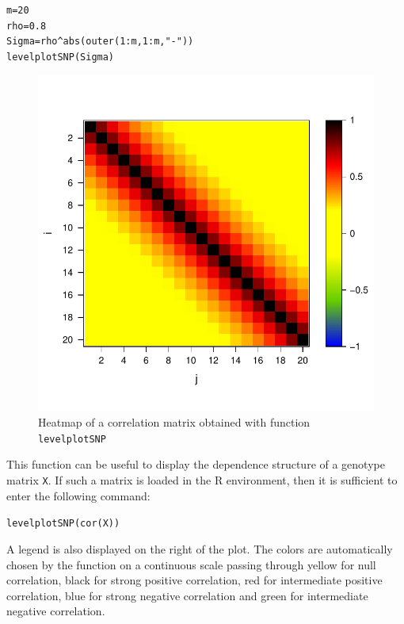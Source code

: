 \documentclass[12pt]{article}
\begin{document}
	 \begin{alltt}
m = 20
rho = 0.8
Sigma = rho\^{}abs(outer(1:m,1:m,"-"))
levelplotSNP(Sigma)
	 \end{alltt}

 	\begin{figure}[!h]
 		\centering
 		\vspace*{-4em}
 		\includegraphics{heatmap.pdf}
 		\vspace*{-2em}
 		\caption{Heatmap of a correlation matrix obtained with function \texttt{levelplotSNP}}
 		\label{fig:heatmap}
 	\end{figure}

	 \noindent This function can be useful to display the dependence structure of a genotype matrix \texttt{X}. If such a matrix is loaded in the R environment, then it is sufficient to enter the following command:

	 \begin{alltt}
	levelplotSNP(cor(X))
	 \end{alltt}

 	 \noindent A legend is also displayed on the right of the plot. The colors are automatically chosen by the function on a continuous scale passing through yellow for null correlation, black for strong positive correlation, red for intermediate positive correlation, blue for strong negative correlation and green for intermediate negative correlation.
\end{document}
